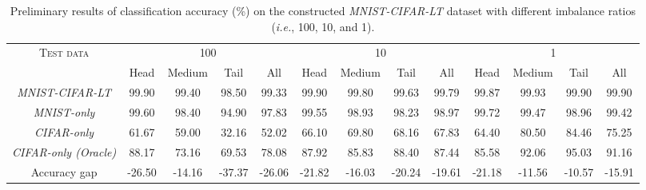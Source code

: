 \documentclass[10pt,journal,compsoc]{IEEEtran}
\newcommand{\ie}{\emph{i.e.}}
\begin{document}
\begin{table*}[t!]
\centering
\small
\renewcommand\arraystretch{1.1}
\setlength{\tabcolsep}{4.5pt}
\caption{\small Preliminary results of classification accuracy (\%) on the constructed \emph{MNIST-CIFAR-LT} dataset with different imbalance ratios (\ie, 100, 10, and 1).}
\begin{tabular}{c|cccc|cccc|cccc}
\toprule
\multirow{2}{*}{\textsc{Test data}} & \multicolumn{4}{c|}{100}        & \multicolumn{4}{c|}{10}         & \multicolumn{4}{c}{1}          \\
\cline{2-13}
                           & \textsf{Head}  & \textsf{Medium} & \textsf{Tail}  & \textsf{All}   & \textsf{Head}  & \textsf{Medium} & \textsf{Tail}  & \textsf{All}   & \textsf{Head}  & \textsf{Medium} & \textsf{Tail}  & \textsf{All} \bigstrut[t]  \\
\hline
\emph{MNIST-CIFAR-LT}      & 99.90 & 99.40  & 98.50 & 99.33 & 99.90 & 99.80  & 99.63 & 99.79 & 99.87 & 99.93  & 99.90 & 99.90 \bigstrut[t]\\
\emph{MNIST-only}          & 99.60 & 98.40  & 94.90 & 97.83 & 99.55 & 98.93  & 98.23 & 98.97 & 99.72 & 99.47  & 98.96 & 99.42 \\
\emph{CIFAR-only}          & 61.67 & 59.00  & 32.16 & 52.02 & 66.10 & 69.80  & 68.16 & 67.83 & 64.40 & 80.50  & 84.46 & 75.25 \\
\hline
\emph{CIFAR-only (Oracle)} & 88.17 & 73.16 & 69.53 & 78.08 & 87.92 & 85.83 & 88.40 & 87.44 & 85.58 & 92.06 & 95.03 & 91.16 \\
\hline
\rowcolor[rgb]{ .851,  .851,  .851} Accuracy gap & -26.50 & -14.16 & -37.37 & -26.06 & -21.82 & -16.03 & -20.24 & -19.61 & -21.18 & -11.56 & -10.57 & -15.91 \\
\bottomrule                
\end{tabular}
\label{table:preMNCILT}
\end{table*}
\end{document}
